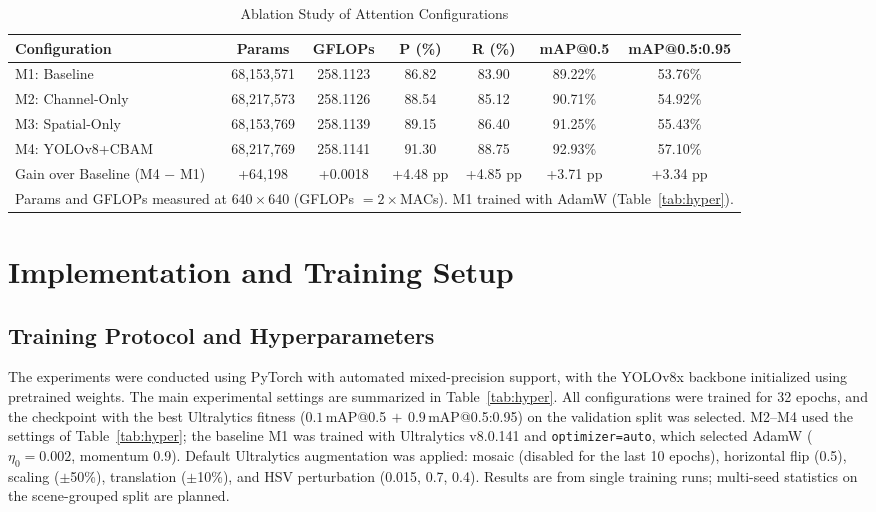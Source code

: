 \documentclass[conference]{IEEEtran}
\begin{document}
\begin{table}[!t]
\caption{Ablation Study of Attention Configurations}
\label{tab:ablation}
\centering
\renewcommand{\arraystretch}{1.1}
\begin{tabular}{|l|c|c|c|c|c|c|}
\hline
\textbf{Configuration} & \textbf{Params} & \textbf{GFLOPs} & \textbf{P (\%)} & \textbf{R (\%)} & \textbf{mAP@0.5} & \textbf{mAP@0.5:0.95} \\
\hline
M1: Baseline     & 68,153,571 & 258.1123 & 86.82 & 83.90 & 89.22\% & 53.76\% \\
M2: Channel-Only & 68,217,573 & 258.1126 & 88.54 & 85.12 & 90.71\% & 54.92\% \\
M3: Spatial-Only & 68,153,769 & 258.1139 & 89.15 & 86.40 & 91.25\% & 55.43\% \\
M4: YOLOv8+CBAM  & 68,217,769 & 258.1141 & 91.30 & 88.75 & 92.93\% & 57.10\% \\
\hline
Gain over Baseline (M4 $-$ M1) & +64,198 & +0.0018 & +4.48 pp & +4.85 pp & +3.71 pp & +3.34 pp \\
\hline
\multicolumn{7}{l}{\footnotesize Params and GFLOPs measured at $640\times640$ (GFLOPs $=2\times$MACs). M1 trained with AdamW (Table~\ref{tab:hyper}).}\\
\end{tabular}
\end{table}

\section{Implementation and Training Setup}

\subsection{Training Protocol and Hyperparameters}

The experiments were conducted using PyTorch with automated mixed-precision support, with the YOLOv8x backbone initialized using pretrained weights. The main experimental settings are summarized in Table~\ref{tab:hyper}. All configurations were trained for 32 epochs, and the checkpoint with the best Ultralytics fitness ($0.1\,$mAP@0.5$\,+\,0.9\,$mAP@0.5:0.95) on the validation split was selected. M2--M4 used the settings of Table~\ref{tab:hyper}; the baseline M1 was trained with Ultralytics v8.0.141 and \texttt{optimizer=auto}, which selected AdamW ($\eta_0=0.002$, momentum 0.9). Default Ultralytics augmentation was applied: mosaic (disabled for the last 10 epochs), horizontal flip (0.5), scaling ($\pm$50\%), translation ($\pm$10\%), and HSV perturbation (0.015, 0.7, 0.4). Results are from single training runs; multi-seed statistics on the scene-grouped split are planned.
\end{document}
